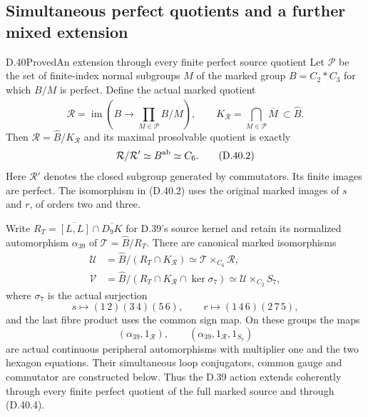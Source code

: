 \subsection{Simultaneous perfect quotients and a further mixed extension}

\begin{statement}{D.40}{Proved}{An extension through every finite perfect source quotient}
Let $\mathscr P$ be the set of finite-index normal subgroups
$M$ of the marked group $B=C_2*C_3$ for which $B/M$ is
perfect. Define the actual marked quotient
\[
 \mathcal R=\overline{\operatorname{im}\!
     \left(B\longrightarrow\prod_{M\in\mathscr P}B/M\right)},
 \qquad
 K_{\mathcal R}=\bigcap_{M\in\mathscr P}\overline M
       \ \subset\widehat B.                              \tag{D.40.1}
\]
Then $\mathcal R=\widehat B/K_{\mathcal R}$ and its maximal
prosolvable quotient is exactly
\[
 \mathcal R/\mathcal R'\simeq B^{\rm ab}\simeq C_6.        \tag{D.40.2}
\]
Here $\mathcal R'$ denotes the closed subgroup generated
by commutators. Its finite images are perfect.
The isomorphism in (D.40.2) uses the original
marked images of $s$ and $r$, of orders two and three.

Write $R_T=\overline{[L,L]}\cap\overline{D_9K}$ for D.39's
source kernel and retain its normalized automorphism
$\alpha_{39}$ of $\mathcal T=\widehat B/R_T$. There are
canonical marked isomorphisms
\[
 \begin{split}
 \mathcal U
   &=\widehat B/(R_T\cap K_{\mathcal R})
     \simeq\mathcal T\mathbin{\times_{C_6}}\mathcal R,\\
 \mathcal V
   &=\widehat B/(R_T\cap K_{\mathcal R}\cap\ker\sigma_7)
     \simeq\mathcal U\mathbin{\times_{C_2}}S_7,
 \end{split}                                             \tag{D.40.3}
\]
where $\sigma_7$ is the actual surjection
\[
 s\longmapsto(1\,2)(3\,4)(5\,6),\qquad
 r\longmapsto(1\,4\,6)(2\,7\,5),                          \tag{D.40.4}
\]
and the last fibre product uses the common sign map.
On these groups the maps
\[
 (\alpha_{39},1_{\mathcal R}),\qquad
 (\alpha_{39},1_{\mathcal R},1_{S_7})                    \tag{D.40.5}
\]
are actual continuous peripheral automorphisms with
multiplier one and the two hexagon equations. Their
simultaneous loop conjugators, common gauge and
commutator are constructed below. Thus the D.39 action
extends coherently through every finite perfect quotient
of the full marked source and through (D.40.4).


\end{statement}
